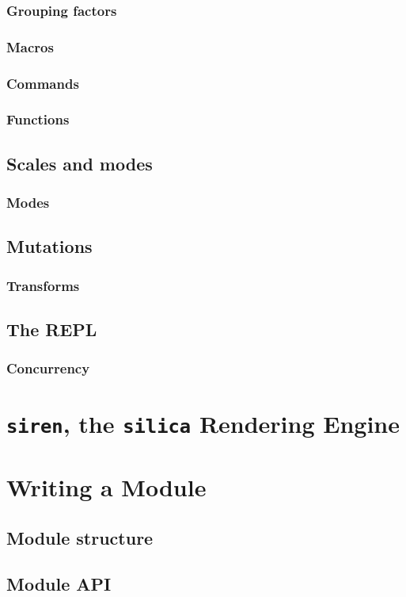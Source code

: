 \documentclass{book}
\begin{document}
\section{Grouping factors}

\section{Macros}

\section{Commands}

\section{Functions}

\chapter{Scales and modes}
\section{Modes}

\chapter{Mutations}
\section{Transforms}

\chapter{The REPL}

\section{Concurrency}

\part{\texttt{siren}, the \texttt{silica} Rendering Engine}

\part{Writing a Module}
\chapter{Module structure}
\chapter{Module API}
\end{document}
